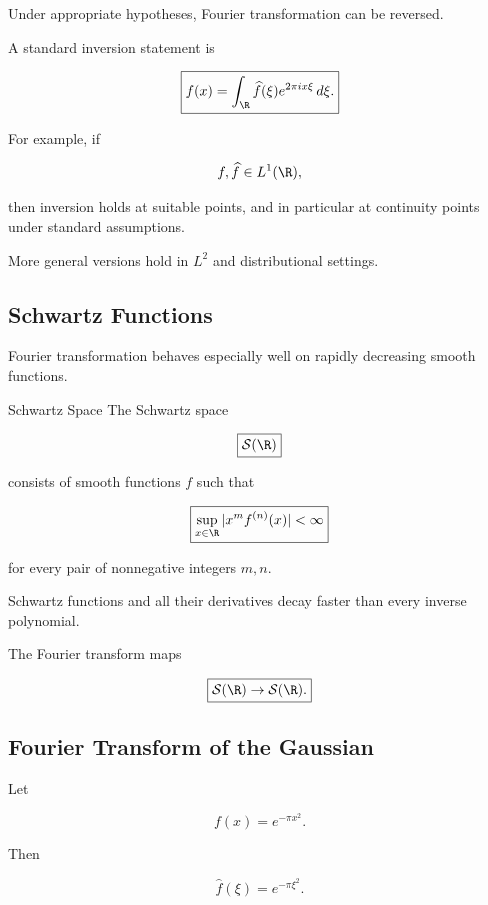 Under appropriate hypotheses, Fourier transformation can be reversed.

A standard inversion statement is

\[
\boxed{
f(x)
=
\int_{\R}
\widehat{f}(\xi)
e^{2\pi i x\xi}
\,d\xi.
}
\]

For example, if

\[
f,\widehat{f}\in L^1(\R),
\]

then inversion holds at suitable points, and in particular at continuity
points under standard assumptions.

More general versions hold in \(L^2\) and distributional settings.

\subsection{Schwartz Functions}
\label{subsec:schwartz-functions}

Fourier transformation behaves especially well on rapidly decreasing
smooth functions.

\begin{definitionbox}{Schwartz Space}
The Schwartz space

\[
\boxed{
\mathcal{S}(\R)
}
\]

consists of smooth functions \(f\) such that

\[
\boxed{
\sup_{x\in\R}
|x^m f^{(n)}(x)|
<\infty
}
\]

for every pair of nonnegative integers \(m,n\).
\end{definitionbox}

Schwartz functions and all their derivatives decay faster than every
inverse polynomial.

The Fourier transform maps

\[
\boxed{
\mathcal{S}(\R)
\to
\mathcal{S}(\R).
}
\]

\subsection{Fourier Transform of the Gaussian}
\label{subsec:fourier-gaussian}

Let

\[
f(x)=e^{-\pi x^2}.
\]

Then

\[
\boxed{
\widehat{f}(\xi)=e^{-\pi\xi^2}.
}
\]

